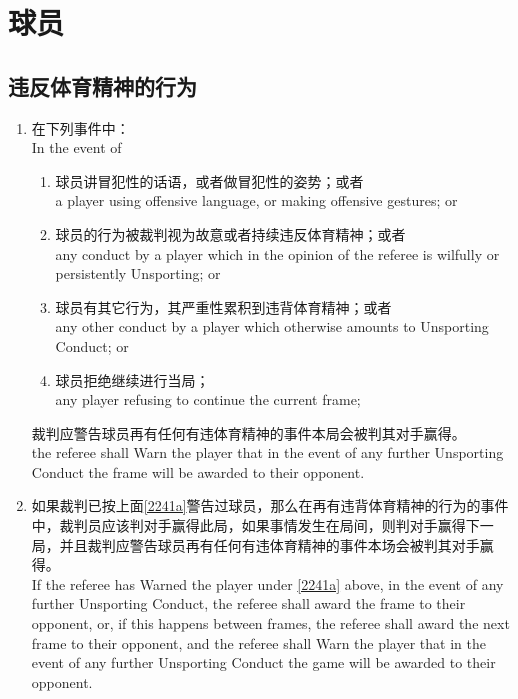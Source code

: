 \section{球员}\label{224}

\subsection{违反体育精神的行为}\label{2241}

\begin{enumerate}[label=(\alph*)]
    \item \label{2241a}在下列事件中：\\
    In the event of 
    \begin{enumerate}[label=(\roman*)]
        \item 球员讲冒犯性的话语，或者做冒犯性的姿势；或者\\
        a player using offensive language, or making offensive gestures; or
        \item 球员的行为被裁判视为故意或者持续违反体育精神；或者\\
        any conduct by a player which in the opinion of the referee is wilfully or persistently Unsporting; or
        \item 球员有其它行为，其严重性累积到违背体育精神；或者\\
        any other conduct by a player which otherwise amounts to Unsporting Conduct; or
        \item 球员拒绝继续进行当局；\\
        any player refusing to continue the current frame;
    \end{enumerate}
    裁判应警告球员再有任何有违体育精神的事件本局会被判其对手赢得。\\
    the referee shall Warn the player that in the event of any further Unsporting Conduct the frame will be awarded to their opponent.
    \item \label{2241b}如果裁判已按上面\ref{2241a}警告过球员，那么在再有违背体育精神的行为的事件中，裁判员应该判对手赢得此局，如果事情发生在局间，则判对手赢得下一局，并且裁判应警告球员再有任何有违体育精神的事件本场会被判其对手赢得。\\
    If the referee has Warned the player under \ref{2241a} above, in the event of any further Unsporting Conduct, the referee shall award the frame to their opponent, or, if this happens between frames, the referee shall award the next frame to their opponent, and the referee shall Warn the player that in the event of any further Unsporting Conduct the game will be awarded to their opponent.

\end{enumerate}
